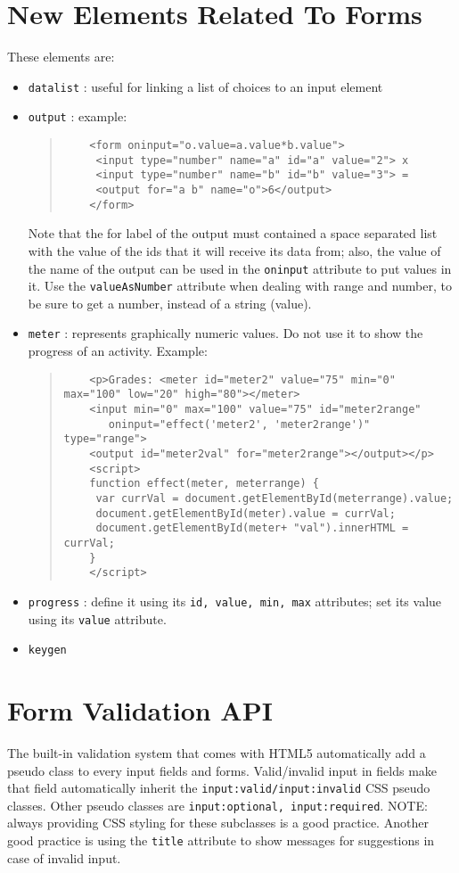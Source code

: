 \documentclass[a4paper,11pt]{book}
\begin{document}
\section{New Elements Related To Forms}
These elements are:
\begin{itemize}
\item \texttt{datalist} : useful for linking a list of choices to an input element
\item \texttt{output} : example:
	\begin{verse}
	\begin{verbatim}
	<form oninput="o.value=a.value*b.value">
     <input type="number" name="a" id="a" value="2"> x
     <input type="number" name="b" id="b" value="3"> =
     <output for="a b" name="o">6</output>
	</form>
	\end{verbatim}
	\end{verse}
	Note that the for label of the output must contained a space separated list
	with the value of the ids that it will receive its data from; also, the value
	of the name of the output can be used in the \texttt{oninput} attribute to
	put values in it. Use the \texttt{valueAsNumber} attribute when dealing with
	range and number, to be sure to get a number, instead of a string (value).
\item \texttt{meter} : represents graphically numeric values. Do not use it to
	show the progress of an activity. Example:
	\begin{verse}
	\begin{verbatim}
	<p>Grades: <meter id="meter2" value="75" min="0" max="100" low="20" high="80"></meter>
	<input min="0" max="100" value="75" id="meter2range"
       oninput="effect('meter2', 'meter2range')" type="range">
 	<output id="meter2val" for="meter2range"></output></p>
 	<script>
 	function effect(meter, meterrange) {
     var currVal = document.getElementById(meterrange).value;
     document.getElementById(meter).value = currVal;
     document.getElementById(meter+ "val").innerHTML = currVal;
 	}
 	</script>
	\end{verbatim}
	\end{verse}
\item \texttt{progress} : define it using its \texttt{id, value, min, max}
	attributes; set its value using its \texttt{value} attribute.
\item \texttt{keygen}
\end{itemize}

\section{Form Validation API}
The built-in validation system that comes with HTML5 automatically add a pseudo class
to every input fields and forms. Valid/invalid input in fields make that field
automatically inherit the \texttt{input:valid/input:invalid} CSS pseudo classes.
Other pseudo classes are \texttt{input:optional, input:required}. NOTE: always
providing CSS styling for these subclasses is a good practice. Another good practice
is using the \texttt{title} attribute to show messages for suggestions
in case of invalid input.
\end{document}
